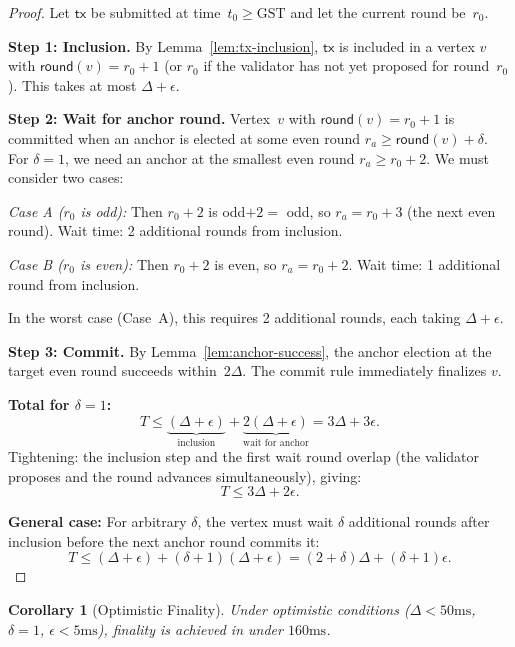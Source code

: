 \documentclass[11pt,a4paper]{article}
\newtheorem{corollary}[theorem]{Corollary}
\theoremstyle{definition}
\theoremstyle{remark}
\newcommand{\GST}{\mathrm{GST}}
\newcommand{\round}{\mathsf{round}}
\begin{document}
\begin{proof}
Let $\mathsf{tx}$ be submitted at time~$t_0 \geq \GST$ and let the
current round be~$r_0$.

\textbf{Step 1: Inclusion.}
By Lemma~\ref{lem:tx-inclusion}, $\mathsf{tx}$ is included in a vertex
$v$ with $\round(v) = r_0 + 1$ (or $r_0$ if the validator has not yet
proposed for round~$r_0$).
This takes at most $\Delta + \epsilon$.

\textbf{Step 2: Wait for anchor round.}
Vertex~$v$ with $\round(v) = r_0 + 1$ is committed when an anchor is
elected at some even round $r_a \geq \round(v) + \delta$.
For $\delta = 1$, we need an anchor at the smallest even
round $r_a \geq r_0 + 2$.
We must consider two cases:

\emph{Case A ($r_0$ is odd):}
Then $r_0 + 2$ is odd$+2=$ odd, so $r_a = r_0 + 3$ (the next even round).
Wait time: 2 additional rounds from inclusion.

\emph{Case B ($r_0$ is even):}
Then $r_0 + 2$ is even, so $r_a = r_0 + 2$.
Wait time: 1 additional round from inclusion.

In the worst case (Case~A), this requires 2 additional rounds, each
taking $\Delta + \epsilon$.

\textbf{Step 3: Commit.}
By Lemma~\ref{lem:anchor-success}, the anchor election at the target
even round succeeds within~$2\Delta$.
The commit rule immediately finalizes $v$.

\textbf{Total for $\delta = 1$:}
\[
  T \leq \underbrace{(\Delta + \epsilon)}_{\text{inclusion}} +
         \underbrace{2(\Delta + \epsilon)}_{\text{wait for anchor}} =
         3\Delta + 3\epsilon.
\]
Tightening: the inclusion step and the first wait round overlap
(the validator proposes and the round advances simultaneously), giving:
\[
  T \leq 3\Delta + 2\epsilon.
\]

\textbf{General case:}
For arbitrary $\delta$, the vertex must wait $\delta$ additional rounds
after inclusion before the next anchor round commits it:
\[
  T \leq (\Delta + \epsilon) + (\delta + 1)(\Delta + \epsilon) =
         (2 + \delta)\Delta + (\delta + 1)\epsilon.
\]
\end{proof}

\begin{corollary}[Optimistic Finality]\label{cor:optimistic}
Under optimistic conditions ($\Delta < 50\text{ms}$, $\delta = 1$,
$\epsilon < 5\text{ms}$), finality is achieved in under $160\text{ms}$.
\end{corollary}
\end{document}
